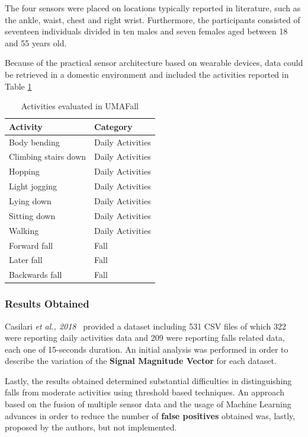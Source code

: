 The four sensors were placed on locations typically reported in literature, such as the ankle, waist, chest and right wrist. Furthermore, the participants consisted of seventeen individuals divided in ten males and seven females aged between 18 and 55 years old.

Because of the practical sensor architecture based on wearable devices, data could be retrieved in a domestic environment and included the activities reported in Table \ref{toc:umafall}

\begin{table}[H]
\centering
\begin{tabular}{ll}
    \hline
    Activity                & Category \\
    \hline
    Body bending            & Daily Activities \\
    Climbing stairs down    & Daily Activities \\
    Hopping                 & Daily Activities \\
    Light jogging           & Daily Activities \\
    Lying down              & Daily Activities \\
    Sitting down            & Daily Activities \\
    Walking                 & Daily Activities \\
    Forward fall            & Fall \\
    Later fall              & Fall \\
    Backwards fall          & Fall \\
    \hline
\end{tabular}
\caption{Activities evaluated in UMAFall}
\label{toc:umafall}
\end{table}

\subsubsection{Results Obtained}\label{subsubsec:umafall-results}

Casilari \textit{et al., 2018}~\cite{umafall} provided a dataset including 531 CSV files of which 322 were reporting daily activities data and 209 were reporting falls related data, each one of 15-seconds duration. An initial analysis was performed in order to describe the variation of the \textbf{Signal Magnitude Vector} for each dataset.

Lastly, the results obtained determined substantial difficulties in distinguishing falls from moderate activities using threshold based techniques. An approach based on the fusion of multiple sensor data and the usage of Machine Learning advances in order to reduce the number of \textbf{false positives} obtained was, lastly, proposed by the authors, but not implemented.

